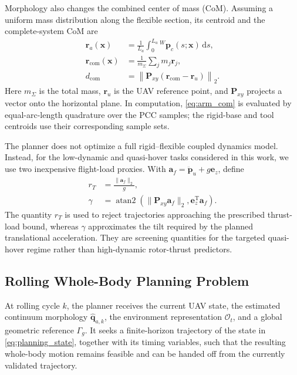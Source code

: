 \documentclass[journal,twoside]{IEEEtran}
\begin{document}
Morphology also changes the combined center of mass (CoM). Assuming a uniform mass distribution along the flexible section, its centroid and the complete-system CoM are
\begin{align}
\mathbf r_a(\mathbf x)
&=\frac{1}{L_a}\int_0^{L_a}{}^{W}\mathbf p_c(s;\mathbf x)\,\mathrm ds,
\label{eq:arm_com}\\
\mathbf r_{\mathrm{com}}(\mathbf x)
&=\frac{1}{m_\Sigma}\sum_j m_j\mathbf r_j,
\label{eq:system_com}\\
 d_{\mathrm{com}}
&=\left\|\mathbf P_{xy}(\mathbf r_{\mathrm{com}}-\mathbf r_u)\right\|_2.
\label{eq:com_offset}
\end{align}
Here $m_\Sigma$ is the total mass, $\mathbf r_u$ is the UAV reference point, and $\mathbf P_{xy}$ projects a vector onto the horizontal plane. In computation, \eqref{eq:arm_com} is evaluated by equal-arc-length quadrature over the PCC samples; the rigid-base and tool centroids use their corresponding sample sets.

The planner does not optimize a full rigid--flexible coupled dynamics model. Instead, for the low-dynamic and quasi-hover tasks considered in this work, we use two inexpensive flight-load proxies. With
$\mathbf a_f=\ddot{\mathbf p}_u+g\mathbf e_z$, define
\begin{equation}
\begin{aligned}
 r_T&=\frac{\|\mathbf a_f\|_2}{g},\\
 \gamma&=\operatorname{atan2}\!\left(
 \|\mathbf P_{xy}\mathbf a_f\|_2,
 \mathbf e_z^{\mathrm T}\mathbf a_f\right).
\end{aligned}
\label{eq:flight_proxy}
\end{equation}
The quantity $r_T$ is used to reject trajectories approaching the prescribed thrust-load bound, whereas $\gamma$ approximates the tilt required by the planned translational acceleration. They are screening quantities for the targeted quasi-hover regime rather than high-dynamic rotor-thrust predictors.

\subsection{Rolling Whole-Body Planning Problem}
At rolling cycle $k$, the planner receives the current UAV state, the estimated continuum morphology $\hat{\mathbf q}_{a,k}$, the environment representation $\mathcal O_t$, and a global geometric reference $\Gamma_g$. It seeks a finite-horizon trajectory of the state in \eqref{eq:planning_state}, together with its timing variables, such that the resulting whole-body motion remains feasible and can be handed off from the currently validated trajectory.
\end{document}
